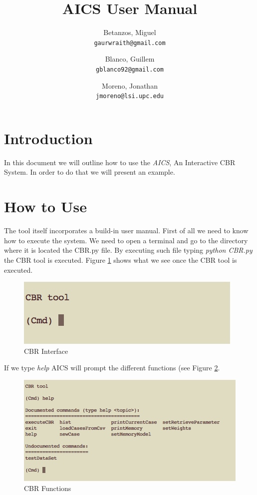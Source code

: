 \documentclass[11pt]{article}
\title{AICS User Manual}
\author{
  Betanzos, Miguel\\
  \texttt{gaurwraith@gmail.com}
  \and
  Blanco, Guillem\\
  \texttt{gblanco92@gmail.com}
  \and
  Moreno, Jonathan\\
  \texttt{jmoreno@lsi.upc.edu}
}
\date{}
\begin{document}
\maketitle


\section{Introduction}

In this document we will outline how to use the \emph{AICS}, An Interactive CBR System. In order to do that we will present an example.

\section{How to Use}

The tool itself incorporates a build-in user manual. First of all we need to know how to execute the system. We need to open a terminal and go to the directory where it is located the CBR.py file. By executing such file typing \emph{python CBR.py} the CBR tool is executed. Figure \ref{fig:main} shows what we see once the CBR tool is executed.

\begin{figure}[htb]
    \center
    \includegraphics[width=0.6\linewidth]{images/main}
    \caption{CBR Interface}
    \label{fig:main}
\end{figure}

If we type \emph{help} AICS will prompt the different functions (see Figure \ref{fig:cbrfunctions}.

\begin{figure}[htb]
    \center
    \includegraphics[width=1\linewidth]{images/cbrfunctions}
    \caption{CBR Functions}
    \label{fig:cbrfunctions}
\end{figure}
\end{document}
